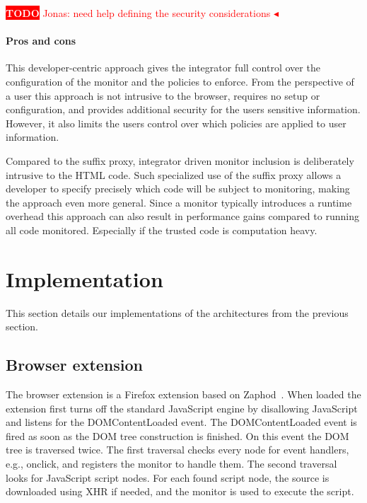 \documentclass{llncs}
\newcommand{\todo}[1]{\colorbox{red}{\textcolor{white}{\sffamily\bfseries\scriptsize TODO}} \textcolor{red}{#1} \textcolor{red}{$\blacktriangleleft$}}
\begin{document}
\todo{Jonas: need help defining the security considerations}

\paragraph{Pros and cons}

This developer-centric approach gives the integrator full control over the 
configuration of the monitor and the policies to enforce. From the perspective of a user this 
approach is not intrusive to the browser, requires no setup or configuration, 
and provides additional security for the users sensitive information. However, 
it also limits the users control over which policies are applied to user information. 

Compared to the suffix proxy, integrator driven monitor 
inclusion is deliberately intrusive to the HTML code. Such specialized use of the suffix 
proxy allows a developer to specify precisely which code will be subject to 
monitoring, making the approach even more general. 
Since a monitor typically introduces a runtime overhead this approach can also 
result in performance gains compared to running all code monitored. Especially 
if the trusted code is computation heavy.



\section{Implementation}
\label{sec:impl}

This section details our implementations of the architectures
from the previous section. 


\subsection{Browser extension}

The browser extension is a Firefox extension based on Zaphod~\cite{Zaphod}.
When loaded the extension first turns off the standard JavaScript engine by
disallowing JavaScript and listens for the DOMContentLoaded event.  The
DOMContentLoaded event is fired as soon as the DOM tree construction is
finished.  On this event the DOM tree is traversed twice. The first traversal
checks every node for event handlers, e.g., onclick, and registers the monitor
to handle them. The second traversal looks for JavaScript script nodes.  For
each found script node, the source is downloaded using XHR if needed, and the
monitor is used to execute the script.
\end{document}
